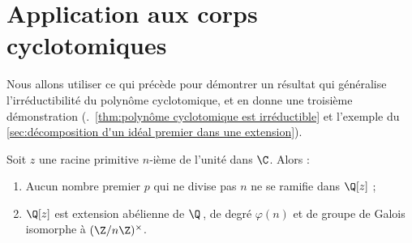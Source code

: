 \documentclass[11pt, %
  title in boldface,
  theorem in new line,
  theorem numbering = section,
  number theorems separately,
  simple name,
]{beaulivre}
\begin{document}
\section{Application aux corps cyclotomiques}\label{sec:application aux corps cyclotomiques}

    Nous allons utiliser ce qui précède pour démontrer un résultat qui généralise l'irréductibilité du polynôme cyclotomique, et en donne une troisième démonstration (\cf.~\cref{thm:polynôme cyclotomique est irréductible} et l'exemple du \cref{sec:décomposition d'un idéal premier dans une extension}).

    \begin{theorem}\label{thm:corps cyclotomique}
        Soit \( z \) une racine primitive \( n \)‑ième de l'unité dans \( \C \). Alors :
        \begin{enumerate}
            \item \label{thm:corps cyclotomique;item1} Aucun nombre premier \( p \) qui ne divise pas \( n \) ne se ramifie dans \( \Q[z] \) ;
            \item \label{thm:corps cyclotomique;item2} \( \Q[z] \) est extension abélienne de \( \Q \)\,, de degré \( \varphi(n) \) et de groupe de Galois isomorphe à \( (\Z/n\Z)^\times \).
        \end{enumerate}
    \end{theorem}
\end{document}

